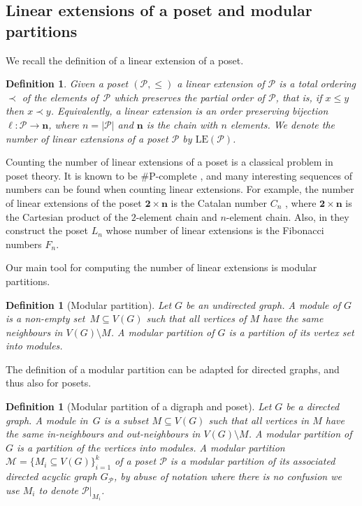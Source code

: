 \documentclass[9pt,a4paper,oneside]{article}
\newtheorem{definition}[theorem]{Definition}
\newcommand{\cM}{\mathcal{M}}
\newcommand{\cP}{\mathcal{P}}
\newcommand{\bn}{\mathbf{n}}
\newcommand{\lex}{\mathrm{LE}}
\begin{document}
\subsection{Linear extensions of a poset and modular partitions}
We recall the definition of a linear extension of a poset.
\begin{definition}
Given a poset $(\cP,\le)$ a \emph{linear extension} of $\cP$ is a total ordering $\prec$ of the elements of~$\cP$ which preserves the partial order of $\cP$, that is, if $x\le y$ then $x\prec y$.
Equivalently, a linear extension is an order preserving bijection $\ell:\cP\rightarrow \bn$, where $n=|\cP|$ and $\bn$ is the chain with $n$ elements.
We denote the number of linear extensions of a poset $\cP$ by $\lex(\cP)$.
\end{definition}

Counting the number of linear extensions of a poset is a classical problem in poset theory. It is known to be \#P-complete \cite{BW91}, and many interesting sequences of numbers can be found when counting linear extensions. For example, the number of linear extensions of the poset $\mathbf{2}\times\bn$ is the Catalan number $C_n$ \cite[Exercise 177]{stanley2015catalan}, where $\mathbf{2}\times\bn$ is the Cartesian product of the $2$-element chain and $n$-element chain. Also, in \cite{Bri99} they construct the poset $L_n$ whose number of linear extensions is the Fibonacci numbers $F_n$. 

Our main tool for computing the number of linear extensions is modular partitions.
\begin{definition}[Modular partition]
Let $G$ be an undirected graph.  A \emph{module} of $G$ is a non-empty set~$M\subseteq V(G)$ such that all vertices of $M$ have the same neighbours in $V(G)\setminus M$.
 A \emph{modular partition} of $G$ is a partition of its vertex set into modules.
\end{definition}

The definition of a modular partition can be adapted for directed graphs, and thus also for posets. 

\begin{definition}[Modular partition of a digraph and poset]
Let $G$ be a directed graph. A module in~$G$ is a subset $M\subseteq V(G)$ such that all vertices in $M$ have the same in-neighbours and out-neighbours in $V(G)\setminus M$.
 A modular partition of $G$ is a partition of the vertices into modules.
A modular partition $\cM=\{ M_i\subseteq V(G)\}_{i=1}^k$ of a poset $\cP$ is a modular partition of its associated directed acyclic graph $G_\cP$, 
by abuse of notation where there is no confusion we use $M_i$ to denote $\cP|_{M_i}$.
\end{definition}
\end{document}
